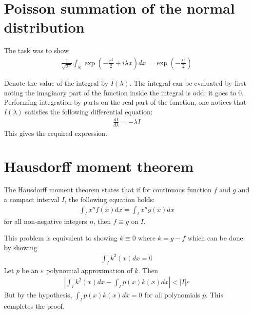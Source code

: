 \documentclass{article}
\begin{document}
\section{Poisson summation of the normal distribution}
The task was to show
\begin{align*}
    \frac{1}{\sqrt{2\pi}} \int_{\mathbb{R}} \exp\left(-\frac{x^2}{2} + i\lambda x\right) dx = \exp\left( -\frac{\lambda^2}{2} \right)
\end{align*}

Denote the value of the integral by $I(\lambda)$. The integral can be evaluated by first noting the imaginary part of the function inside the integral is odd; it goes to $0$. Performing integration by parts on the real part of the function, one notices that $I(\lambda)$ satisfies the following differential equation:
\begin{align*}
    \frac{dI}{d\lambda} = -\lambda I
\end{align*}
This gives the required expression.

\section{Hausdorff moment theorem}
The Hausdorff moment theorem states that if for continuous function $f$ and $g$ and a compact interval $I$, the following equation holds:
\begin{align*}
    \int_{I}x^nf(x) dx = \int_{I}x^ng(x) dx
\end{align*}
for all non-negative integers $n$, then $f \equiv g$ on $I$.

This problem is equivalent to showing $k \equiv 0$ where $k =g-f$ which can be done by showing
\begin{align*}
    \int_{I}k^2(x) dx = 0
\end{align*}
Let $p$ be an $\varepsilon$ polynomial approximation of $k$. Then
\begin{align*}
    \left|\int_{I}k^2(x) dx - \int_{I}p(x) k(x) dx \right| < |I|\varepsilon
\end{align*}
But by the hypothesis, $\displaystyle \int_{I}p(x)k(x) dx = 0$ for all polynomials $p$. This completes the proof.
\end{document}
